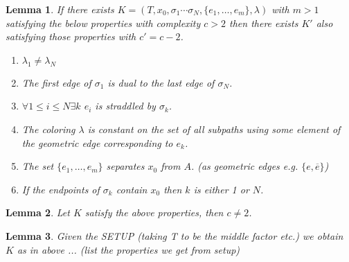 \documentclass{article}
\theoremstyle{mystyle}
\newtheorem{lem}{Lemma}[section]
\theoremstyle{remark}
\begin{document}
\begin{lem}
	If there exists \(K=(T,x_{0} ,\sigma_{1} \cdots \sigma_{N} , \{ e_{ 1} ,\ldots, e_{m}  \}, \lambda )\) with \(m > 1\) satisfying the below properties with complexity \(c > 2\) then there exists \(K'\) also satisfying those properties with \(c' = c - 2\).
	\begin{enumerate}
		\item \(\lambda_{1} \neq \lambda_{N} \) 
		\item The first edge of \(\sigma_{1}\) is dual to the last edge of \(\sigma_{N}\).
		\item \(\forall 1 \leq i \leq N \exists k\) \(e_{i}\) is {\em straddled} by \(\sigma_k\).
		\item 	 The coloring \(\lambda\) is constant on the set of all subpaths using some element of the geometric edge corresponding to \(e_{k}\).
		\item 	 The set \(\{e_{1},\ldots, e_{m}\}\) separates \(x_{0}\) from \(A\). (as geometric edges e.g. \(\{e, \overline{e}\}\))

		\item If the endpoints of \(\sigma_{k}\) contain \(x_{0}\) then \(k\) is either 1 or \(N\).
	\end{enumerate}
\end{lem}

\begin{lem}
	Let \(K\) satisfy the above properties, then \(c \neq 2\).
\end{lem}

\begin{lem}
	Given the SETUP (taking T to be the middle factor etc.) we obtain \(K\) as in above ... (list the properties we get from setup)
\end{lem}
\end{document}
